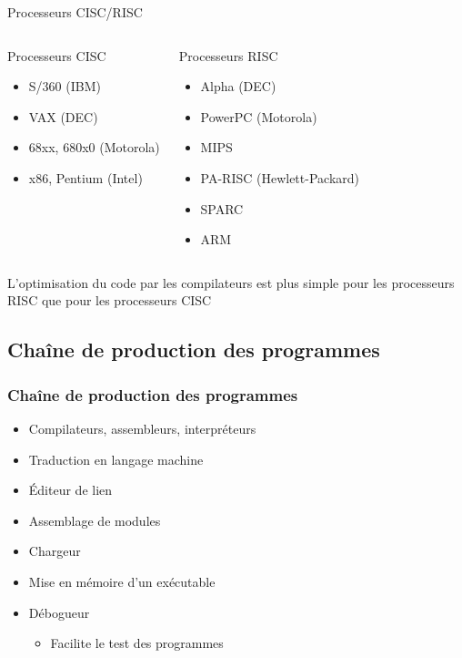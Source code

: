 \begin{frame}{Processeurs CISC/RISC}
\begin{columns}
\begin{exampleblock}{Processeurs CISC}
\begin{itemize}
\item S/360 (IBM)
\item VAX (DEC)
\item 68xx, 680x0 (Motorola)
\item x86, Pentium (Intel)
\end{itemize}

\end{exampleblock}
\begin{exampleblock}{Processeurs RISC}
\begin{itemize}
\item Alpha (DEC)
\item PowerPC (Motorola)
\item MIPS
\item PA-RISC (Hewlett-Packard)
\item SPARC
\item ARM 
\end{itemize}
\end{exampleblock}
\end{columns}
\begin{center}
L'optimisation du code par les compilateurs est plus simple pour les processeurs RISC que pour les processeurs CISC
\end{center}
\end{frame}



\subsection{Chaîne de production des programmes}
\begin{frame}
\frametitle{Chaîne de production des programmes}
\begin{itemize}
\item Compilateurs, assembleurs, interpréteurs
\item Traduction en langage machine
\item Éditeur de lien
\item Assemblage de modules
\item Chargeur
\item Mise en mémoire d’un exécutable
\item Débogueur
\begin{itemize}
\item Facilite le test des programmes
\end{itemize}
\end{itemize}
\end{frame}



